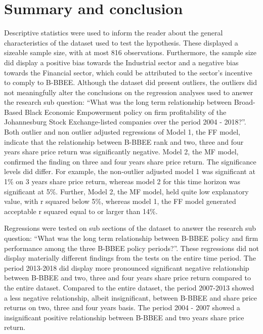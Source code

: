 \section{Summary and conclusion}
Descriptive statistics were used to inform the reader about the general characteristics of the dataset used to test the hypothesis. These displayed a sizeable sample size, with at most 816 observations. Furthermore, the sample size did display a positive bias towards the Industrial sector and a negative bias towards the Financial sector, which could be attributed to the sector’s incentive to comply to B-BBEE. Although the dataset did present outliers, the outliers did not meaningfully alter the conclusions on the regression analyses used to answer the research sub question: “What was the long term relationship between Broad-Based Black Economic Empowerment policy on firm profitability of the Johannesburg Stock Exchange-listed companies over the period 2004 - 2018?”. Both outlier and non outlier adjusted regressions of Model 1, the FF model, indicate that the relationship between B-BBEE rank and two, three and four years share price return  was significantly negative. Model 2, the MF model, confirmed the finding on three and four years share price return. The significance levels did differ. For example, the non-outlier adjusted model 1 was significant at 1\% on 3 years share price return, whereas model 2 for this time horizon was significant at 5\%. Further, Model 2, the  MF model, held quite low explanatory value, with r squared below 5\%, whereas model 1, the FF model generated acceptable r squared equal to or larger than 14\%. 

Regressions were tested on sub sections of the dataset to answer the research sub question: “What was the long term relationship between B-BBEE policy and firm performance among the three B-BBEE policy periods?”. These regressions did not display materially different findings from the tests on the entire time period. The period 2013-2018 did display more pronounced significant negative relationship between B-BBEE and two, three and four years share price return compared to the entire dataset. Compared to the entire dataset, the period 2007-2013 showed  a less negative relationship, albeit insignificant, between B-BBEE and share price returns on two, three and four years basis. The period 2004 - 2007 showed a insignificant positive relationship between B-BBEE and two years share price return.

